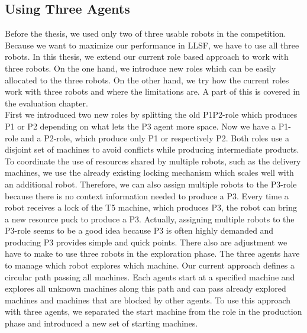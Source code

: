 \subsection{Using Three Agents}
Before the thesis, we used only two of three usable robots in the competition. Because we want to maximize our performance in LLSF, we have to use all three robots. In this thesis, we extend our current role based approach to work with three robots. On the one hand, we introduce new roles which can be easily allocated to the three robots. On the other hand, we try how the current roles work with three robots and where the limitations are. A part of this is covered in the evaluation chapter.\\
First we introduced two new roles by splitting the old P1P2-role which produces P1 or P2 depending on what lets the P3 agent more space. Now we have a P1-role and a P2-role, which produce only P1 or respectively P2. Both roles use a disjoint set of machines to avoid conflicts while producing intermediate products. To coordinate the use of resources shared by multiple robots, such as the delivery machines, we use the already existing locking mechanism which scales well with an additional robot. Therefore, we can also assign multiple robots to the P3-role because there is no context information needed to produce a P3. Every time a robot receives a lock of the T5 machine, which produces P3, the robot can bring a new resource puck to produce a P3. Actually, assigning multiple robots to the P3-role seems to be a good idea because P3 is often highly demanded and producing P3 provides simple and quick points. There also are adjustment we have to make to use three robots in the exploration phase. The three agents have to manage which robot explores which machine. Our current approach defines a circular path passing all machines. Each agents start at a specified machine and explores all unknown machines along this path and can pass already explored machines and machines that are blocked by other agents. To use this approach with three agents, we separated the start machine from the role in the production phase and introduced a new set of starting machines.


